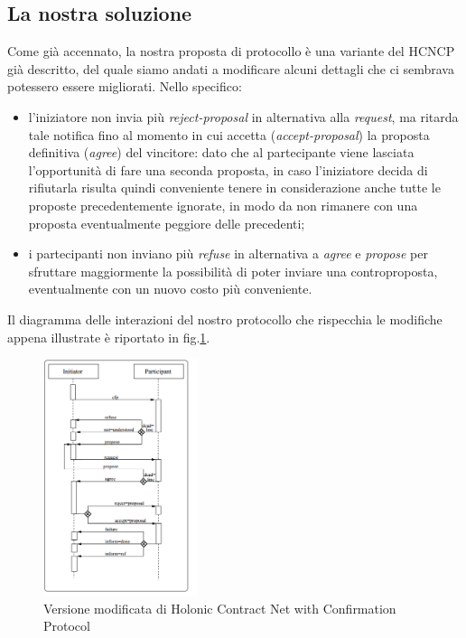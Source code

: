 \documentclass[a4paper, 10pt, conference]{ieeeconf} %
\begin{document}
\subsection*{La nostra soluzione} \label{ss2}
Come già accennato, la nostra proposta di protocollo è una variante del HCNCP già descritto, del quale siamo andati a modificare alcuni dettagli che ci sembrava potessero essere migliorati. Nello specifico:
\begin{itemize}
\item{l'iniziatore non invia più \emph{reject-proposal} in alternativa alla \emph{request}, ma ritarda tale notifica fino al momento in cui accetta (\emph{accept-proposal}) la proposta definitiva (\emph{agree}) del vincitore: dato che al partecipante viene lasciata l'opportunità di fare una seconda proposta, in caso l'iniziatore decida di rifiutarla risulta quindi conveniente tenere in considerazione anche tutte le proposte precedentemente ignorate, in modo da non rimanere con una proposta eventualmente peggiore delle precedenti;}
\item{i partecipanti non inviano più \emph{refuse} in alternativa a \emph{agree} e \emph{propose} per sfruttare maggiormente la possibilità di poter inviare una controproposta, eventualmente con un nuovo costo più conveniente.}
\end{itemize}
Il diagramma delle interazioni del nostro protocollo che rispecchia le modifiche appena illustrate è riportato in fig.\ref{f4}.

\begin{figure}[t]
\centering
\includegraphics[width=0.4\textwidth]{proto2.png}
\caption{Versione modificata di Holonic Contract Net with Confirmation Protocol} \label{f4}
\end{figure}
\end{document}
